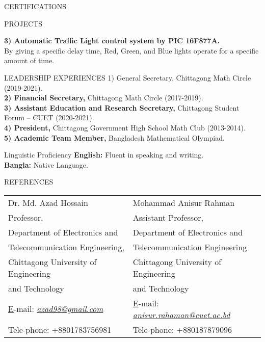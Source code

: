\documentclass{resume}
\begin{document}
\begin{rSection}{CERTIFICATIONS}
\begin{rSection}{PROJECTS}
\begin{rSubsection}{}{} {} {}
\item \textbf{3) Automatic Traffic Light control system by PIC 16F877A.} \\
\normalfont By giving a specific delay time, Red, Green, and Blue lights operate for a specific amount of time.
\end{rSubsection}
\end{rSection}

\begin{rSection}{LEADERSHIP EXPERIENCES} 
1) General Secretary, \normalfont Chittagong Math Circle (2019-2021). \\
\textbf{2) Financial Secretary,} \normalfont Chittagong Math Circle (2017-2019). \\
\textbf{3) Assistant Education and Research Secretary,} \normalfont Chittagong Student Forum – CUET (2020-2021). \\
\textbf{4) President,} \normalfont Chittagong Government High School Math Club (2013-2014). \\
\textbf{5) Academic Team Member,} \normalfont Bangladesh Mathematical Olympiad.

\end{rSection}

\begin{rSection}{Linguistic Proficiency}
\textbf{English:} \normalfont Fluent in speaking and writing.\\
\textbf{Bangla:} \normalfont Native Language.  
\end{rSection}

\begin{rSection}{REFERENCES}
\begin{tabular}{l l}
Dr. Md. Azad Hossain & Mohammad Anisur Rahman \\
Professor, & Assistant Professor,\\
\normalfont Department of Electronics and & \normalfont Department of Electronics and \\
\normalfont Telecommunication Engineering, & \normalfont Telecommunication Engineering \\
\normalfont Chittagong University of Engineering & \normalfont Chittagong University of Engineering \\
\normalfont and Technology & \normalfont and Technology \\
\normalfont \href{mailto:azad98@gmail.com} E-mail: \textit{\ul{azad98@gmail.com}} & \normalfont\href{mailto:anisur.rahaman@cuet.ac.bd} E-mail: \textit{\ul{anisur.rahaman@cuet.ac.bd}} \\
\normalfont Tele-phone: +8801783756981 & \normalfont Tele-phone: +880187879096
\end{tabular}
\end{rSection}    
\end{rSection}
\end{document}

